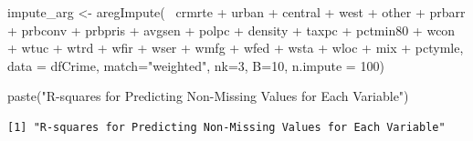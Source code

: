 \documentclass[]{article}
\newenvironment{Shaded}{}{}
\newcommand{\DataTypeTok}[1]{#1}
\newcommand{\DecValTok}[1]{#1}
\newcommand{\KeywordTok}[1]{\textcolor[rgb]{0.00,0.00,1.00}{#1}}
\newcommand{\NormalTok}[1]{#1}
\newcommand{\OperatorTok}[1]{#1}
\newcommand{\StringTok}[1]{\textcolor[rgb]{0.00,0.50,0.50}{#1}}
\begin{document}
\begin{Shaded}
\begin{Highlighting}[]
\NormalTok{impute_arg <-}\StringTok{ }\KeywordTok{aregImpute}\NormalTok{(}\OperatorTok{~}\StringTok{ }\NormalTok{crmrte }\OperatorTok{+}\StringTok{  }\NormalTok{urban }\OperatorTok{+}\StringTok{ }\NormalTok{central }\OperatorTok{+}\StringTok{ }\NormalTok{west }\OperatorTok{+}\StringTok{ }\NormalTok{other }\OperatorTok{+}
\StringTok{                         }\NormalTok{prbarr }\OperatorTok{+}\StringTok{ }\NormalTok{prbconv }\OperatorTok{+}\StringTok{ }\NormalTok{prbpris }\OperatorTok{+}\StringTok{ }\NormalTok{avgsen }\OperatorTok{+}\StringTok{ }\NormalTok{polpc }\OperatorTok{+}
\StringTok{                         }\NormalTok{density }\OperatorTok{+}\StringTok{ }\NormalTok{taxpc }\OperatorTok{+}\StringTok{ }\NormalTok{pctmin80 }\OperatorTok{+}\StringTok{ }\NormalTok{wcon }\OperatorTok{+}\StringTok{ }\NormalTok{wtuc }\OperatorTok{+}
\StringTok{                         }\NormalTok{wtrd }\OperatorTok{+}\StringTok{ }\NormalTok{wfir }\OperatorTok{+}\StringTok{ }\NormalTok{wser }\OperatorTok{+}\StringTok{ }\NormalTok{wmfg }\OperatorTok{+}\StringTok{ }\NormalTok{wfed }\OperatorTok{+}\StringTok{ }\NormalTok{wsta }\OperatorTok{+}\StringTok{ }\NormalTok{wloc }\OperatorTok{+}
\StringTok{                         }\NormalTok{mix }\OperatorTok{+}\StringTok{ }\NormalTok{pctymle, }\DataTypeTok{data =}\NormalTok{ dfCrime, }\DataTypeTok{match=}\StringTok{"weighted"}\NormalTok{,}
                         \DataTypeTok{nk=}\DecValTok{3}\NormalTok{, }\DataTypeTok{B=}\DecValTok{10}\NormalTok{, }\DataTypeTok{n.impute =} \DecValTok{100}\NormalTok{)}
\end{Highlighting}
\end{Shaded}

\begin{Shaded}
\begin{Highlighting}[]
\KeywordTok{paste}\NormalTok{(}\StringTok{"R-squares for Predicting Non-Missing Values for Each Variable"}\NormalTok{)}
\end{Highlighting}
\end{Shaded}

\begin{verbatim}
[1] "R-squares for Predicting Non-Missing Values for Each Variable"
\end{verbatim}

\begin{Shaded}
\end{Shaded}
\end{document}
